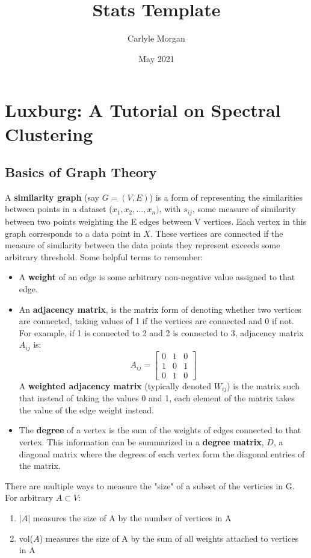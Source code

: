 \documentclass{article}
\title{Stats Template}
\author{Carlyle Morgan}
\date{May 2021}
\begin{document}
    \section{Luxburg: A Tutorial on Spectral Clustering}

        \subsection{Basics of Graph Theory}
            A \textbf{similarity graph} (say $G = (V,E)$) is a form of representing the similarities between points in a dataset ($x_1, x_2, ..., x_n)$, with $s_{ij}$, some measure of similarity between two points weighting the E edges between V vertices. Each vertex in this graph corresponds to a data point in $X$. These vertices are connected if the measure of similarity between the data points they represent exceeds some arbitrary threshold. 
    Some helpful terms to remember:
            \begin{itemize}
                \item A \textbf{weight} of an edge is some arbitrary non-negative value assigned to that edge. 
                \item An \textbf{adjacency matrix},  is the matrix form of denoting whether two vertices are connected, taking values of 1 if the vertices are connected and 0 if not. For example, if 1 is connected to 2 and 2 is connected to 3, adjacency matrix $A_{ij} $ is:
                        $$A_{ij} = \begin{bmatrix}
                0 & 1 & 0\\
                1 & 0 & 1\\
                0 & 1 & 0
                \end{bmatrix}$$
                A \textbf{weighted adjacency matrix} (typically denoted $W_{ij}$) is the matrix such that instead of taking the values 0 and 1, each element of the matrix takes the value of the edge weight instead.
                \item The \textbf{degree} of a vertex is the sum of the weights of edges connected to that vertex. This information can be summarized in a \textbf{degree matrix}, $D$, a diagonal matrix where the degrees of each vertex form the diagonal entries of the matrix. 
                \end{itemize}
    There are multiple ways to measure the "size" of a subset of the verticies in G. For arbitrary $A \subset V$:
    
\begin{enumerate}
\item  $\left|A\right|$ measures the size of A by the number of vertices in A
\item vol($A$) measures the size of A by the sum of all weights attached to vertices in A
\end{enumerate}
\end{document}
